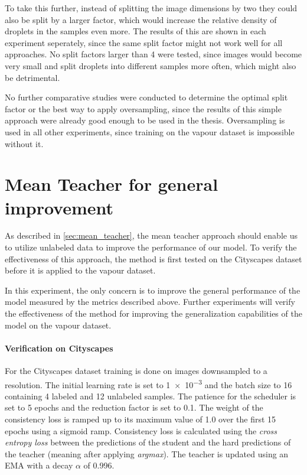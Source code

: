 To take this further, instead of splitting the image dimensions by two they could also be split by a larger factor, which would increase the relative density of droplets in the samples even more.
The results of this are shown in each experiment seperately, since the same split factor might not work well for all approaches.
No split factors larger than 4 were tested, since images would become very small and split droplets into different samples more often, which might also be detrimental. 

No further comparative studies were conducted to determine the optimal split factor or the best way to apply oversampling, since the results of this simple approach were already good enough to be used in the thesis.
Oversampling is used in all other experiments, since training on the vapour dataset is impossible without it.

\section{Mean Teacher for general improvement}
\label{sec:mean_teacher_general}

As described in \ref{sec:mean_teacher}, the mean teacher approach should enable us to utilize unlabeled data to improve the performance of our model.
To verify the effectiveness of this approach, the method is first tested on the Cityscapes dataset before it is applied to the vapour dataset.

In this experiment, the only concern is to improve the general performance of the model measured by the metrics described above. 
Further experiments will verify the effectiveness of the method for improving the generalization capabilities of the model on the vapour dataset.

\paragraph{Verification on Cityscapes} 

For the Cityscapes dataset training is done on images downsampled to a  resolution. The initial learning rate is set to \num{1e-3} and the batch size to 16 containing 4 labeled and 12 unlabeled samples. The patience for the scheduler is set to 5 epochs and the reduction factor is set to \num{0.1}.
The weight of the consistency loss is ramped up to its maximum value of \num{1.0} over the first 15 epochs using a sigmoid ramp.
Consistency loss is calculated using the \emph{cross entropy loss} between the predictions of the student and the hard predictions of the teacher (meaning after applying \emph{argmax}).
The teacher is updated using an EMA with a decay $\alpha$ of \num{0.996}.

